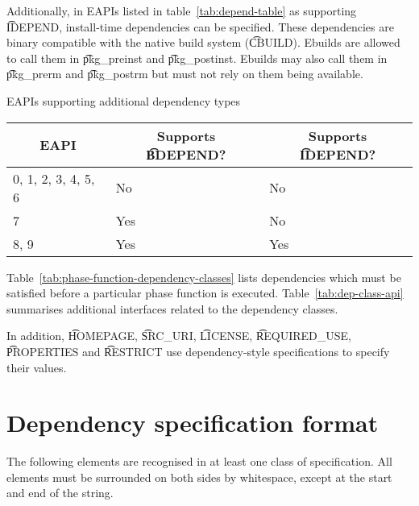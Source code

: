 Additionally, in EAPIs listed in table~\ref{tab:depend-table} as supporting
\t{IDEPEND}, install-time dependencies can be specified. These dependencies are binary compatible
with the native build system (\t{CBUILD}). Ebuilds are allowed to call them in \t{pkg_preinst} and
\t{pkg_postinst}. Ebuilds may also call them in \t{pkg_prerm} and \t{pkg_postrm} but must not rely
on them being available.

\begin{centertable}{EAPIs supporting additional dependency types}
    \label{tab:depend-table}
    \begin{tabular}{lll}
      \toprule
      \multicolumn{1}{c}{\textbf{EAPI}} &
      \multicolumn{1}{c}{\textbf{Supports \t{BDEPEND}?}} &
      \multicolumn{1}{c}{\textbf{Supports \t{IDEPEND}?}} \\
      \midrule
      0, 1, 2, 3, 4, 5, 6 & No  & No  \\
      7                   & Yes & No  \\
      8, 9                & Yes & Yes \\
      \bottomrule
    \end{tabular}
\end{centertable}

Table~\ref{tab:phase-function-dependency-classes} lists dependencies which must be satisfied before
a particular phase function is executed. Table~\ref{tab:dep-class-api} summarises additional
interfaces related to the dependency classes.

In addition, \t{HOMEPAGE}, \t{SRC_URI}, \t{LICENSE}, \t{REQUIRED_USE}, \t{PROPERTIES} and
\t{RESTRICT} use dependency-style specifications to specify their values.

\section{Dependency specification format}
\label{sec:dependency-spec}

The following elements are recognised in at least one class of specification. All elements must
be surrounded on both sides by whitespace, except at the start and end of the string.

